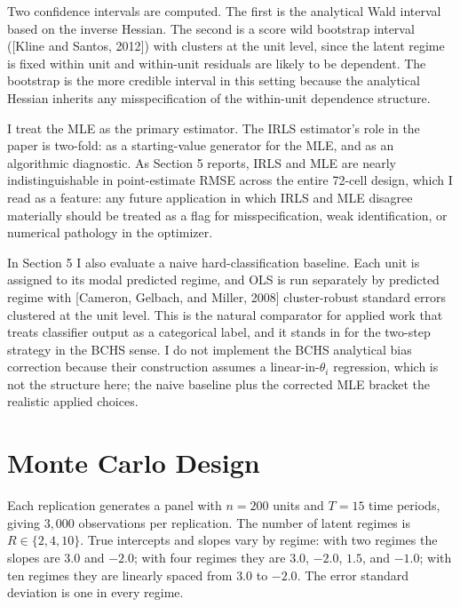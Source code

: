 \documentclass[
  12pt,
  letterpaper]{article}
\begin{document}
Two confidence intervals are computed. The first is the analytical Wald
interval based on the inverse Hessian. The second is a score wild
bootstrap interval ({[}Kline and Santos, 2012{]}) with clusters at the
unit level, since the latent regime is fixed within unit and within-unit
residuals are likely to be dependent. The bootstrap is the more credible
interval in this setting because the analytical Hessian inherits any
misspecification of the within-unit dependence structure.

I treat the MLE as the primary estimator. The IRLS estimator's role in
the paper is two-fold: as a starting-value generator for the MLE, and as
an algorithmic diagnostic. As Section 5 reports, IRLS and MLE are nearly
indistinguishable in point-estimate RMSE across the entire 72-cell
design, which I read as a feature: any future application in which IRLS
and MLE disagree materially should be treated as a flag for
misspecification, weak identification, or numerical pathology in the
optimizer.

In Section 5 I also evaluate a naive hard-classification baseline. Each
unit is assigned to its modal predicted regime, and OLS is run
separately by predicted regime with {[}Cameron, Gelbach, and Miller,
2008{]} cluster-robust standard errors clustered at the unit level. This
is the natural comparator for applied work that treats classifier output
as a categorical label, and it stands in for the two-step strategy in
the BCHS sense. I do not implement the BCHS analytical bias correction
because their construction assumes a linear-in-\(\theta_i\) regression,
which is not the structure here; the naive baseline plus the corrected
MLE bracket the realistic applied choices.

\FloatBarrier

\section{Monte Carlo Design}\label{monte-carlo-design}

Each replication generates a panel with \(n = 200\) units and \(T = 15\)
time periods, giving \(3{,}000\) observations per replication. The
number of latent regimes is \(R \in \{2, 4, 10\}\). True intercepts and
slopes vary by regime: with two regimes the slopes are \(3.0\) and
\(-2.0\); with four regimes they are \(3.0\), \(-2.0\), \(1.5\), and
\(-1.0\); with ten regimes they are linearly spaced from \(3.0\) to
\(-2.0\). The error standard deviation is one in every regime.
\end{document}

